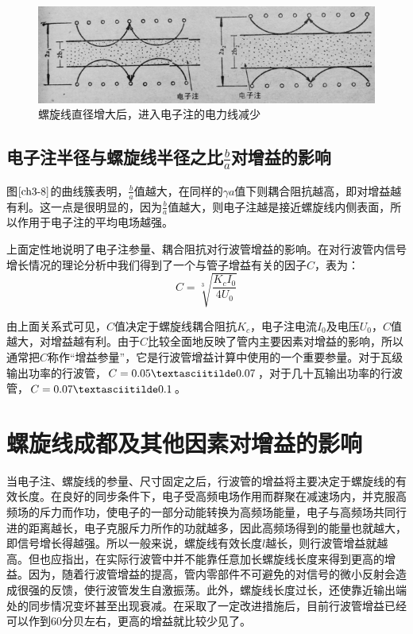 \begin{figure}[phtb]
	\centering
	\includegraphics[width=0.65\linewidth]{figure/ch4-2}
	\caption{螺旋线直径增大后，进入电子注的电力线减少}
	\label{ch4-2}
\end{figure}
\subsection[电子注半径与螺旋线半径之比b/a对增益的影响]{电子注半径与螺旋线半径之比$ \frac{b}{a} $对增益的影响}
 图$ \ref{ch3-8} $的曲线簇表明，$ \frac{b}{a} $值越大，在同样的$ \gamma a $值下则耦合阻抗越高，即对增益越有利。这一点是很明显的，因为$ \frac{b}{a} $值越大，则电子注越是接近螺旋线内侧表面，所以作用于电子注的平均电场越强。
 
 上面定性地说明了电子注参量、耦合阻抗对行波管增益的影响。在对行波管内信号增长情况的理论分析中我们得到了一个与管子增益有关的因子$ C $，表为：
 \begin{equation} \label{eq:4-3}
 	C = \sqrt[3]{\frac{K_cI_0}{4U_0}}
 \end{equation}
 
 由上面关系式可见，$ C $值决定于螺旋线耦合阻抗$ K_c $，电子注电流$ I_0 $及电压$U_0 $，$ C $值越大，对增益越有利。由于$ C $比较全面地反映了管内主要因素对增益的影响，所以通常把$ C $称作“增益参量”，它是行波管增益计算中使用的一个重要参量。对于瓦级输出功率的行波管，$ C = 0.05\textasciitilde0.07 $，对于几十瓦输出功率的行波管，$ C = 0.07\textasciitilde0.1 $。
 
\section{螺旋线成都及其他因素对增益的影响}
 当电子注、螺旋线的参量、尺寸固定之后，行波管的增益将主要决定于螺旋线的有效长度。在良好的同步条件下，电子受高频电场作用而群聚在减速场内，并克服高频场的斥力而作功，使电子的一部分动能转换为高频场能量，电子与高频场共同行进的距离越长，电子克服斥力所作的功就越多，因此高频场得到的能量也就越大，即信号增长得越强。所以一般来说，螺旋线有效长度$ l $越长，则行波管增益就越高。但也应指出，在实际行波管中并不能靠任意加长螺旋线长度来得到更高的增益。因为，随着行波管增益的提高，管内零部件不可避免的对信号的微小反射会造成很强的反馈，使行波管发生自激振荡。此外，螺旋线长度过长，还使靠近输出端处的同步情况变坏甚至出现衰减。在采取了一定改进措施后，目前行波管增益已经可以作到60分贝左右，更高的增益就比较少见了。

